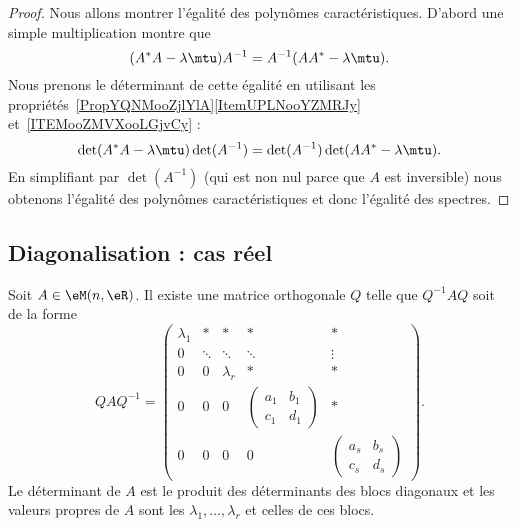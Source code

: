\begin{proof}
    Nous allons montrer l'égalité des polynômes caractéristiques. D'abord une simple multiplication montre que
    \begin{equation}
        (A^*A-\lambda\mtu)A^{-1}=A^{-1}(AA^*-\lambda\mtu).
    \end{equation}
    Nous prenons le déterminant de cette égalité en utilisant les propriétés~\ref{PropYQNMooZjlYlA}\ref{ItemUPLNooYZMRJy} et~\ref{ITEMooZMVXooLGjvCy} :
    \begin{equation}
        \det(A^*A-\lambda\mtu)\det(A^{-1})=\det(A^{-1})\det(AA^*-\lambda\mtu).
    \end{equation}
    En simplifiant par \( \det(A^{-1})\) (qui est non nul parce que \( A\) est inversible) nous obtenons l'égalité des polynômes caractéristiques et donc l'égalité des spectres.
\end{proof}

\subsection{Diagonalisation : cas réel}

\begin{lemma}  \label{LemSchureRelnrqfiy}
    Soit \( A\in\eM(n,\eR)\). Il existe une matrice orthogonale \( Q\) telle que \( Q^{-1}AQ\) soit de la forme
    \begin{equation}        \label{EqMtrTSqRTA}
        QAQ^{-1}=\begin{pmatrix}
            \lambda_1    &   *    &   *    &   *    &   *\\
            0    &   \ddots    &   \ddots    &   \ddots    &   \vdots\\
            0    &   0    &   \lambda_r    &   *    &   *\\
            0    &   0    &   0    &   \begin{pmatrix}
                a_1    &   b_1    \\
                c_1    &   d_1
            \end{pmatrix}&   *\\
            0    &   0    &  0     &   0    &   \begin{pmatrix}
                a_s    &   b_s    \\
                c_s    &   d_s
            \end{pmatrix}
        \end{pmatrix}.
    \end{equation}
    Le déterminant de \( A\) est le produit des déterminants des blocs diagonaux et les valeurs propres de \( A\) sont les \( \lambda_1,\ldots, \lambda_r\) et celles de ces blocs.
\end{lemma}

